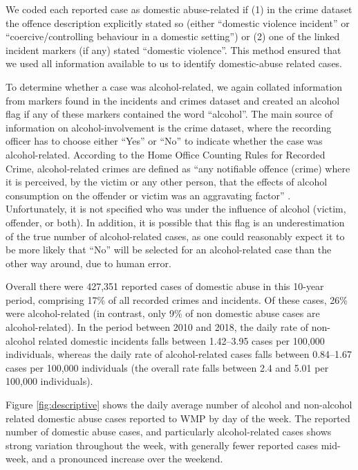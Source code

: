 \documentclass[12pt, a4paper]{article}
\begin{document}
{We coded each reported case as domestic abuse-related if (1) in the crime dataset the offence description explicitly stated so (either ``domestic violence incident'' or ``coercive/controlling behaviour in a domestic setting'') or (2) one of the linked incident markers (if any) stated ``domestic violence''. This method ensured that we used all information available to us to identify domestic-abuse related cases. 

To determine whether a case was alcohol-related, we again collated information from markers found in the incidents and crimes dataset and created an alcohol flag if any of these markers contained the word ``alcohol''. The main source of information on alcohol-involvement is the crime dataset, where the recording officer has to choose either ``Yes'' or ``No'' to indicate whether the case was alcohol-related. According to the Home Office Counting Rules for Recorded Crime, alcohol-related crimes are defined as ``any notifiable offence (crime) where it is perceived, by the victim or any other person, that the
effects of alcohol consumption on the offender or victim was an aggravating factor'' \cite{Office2019}. Unfortunately, it is not specified who was under the influence of alcohol (victim, offender, or both). In addition, it is possible that this flag is an underestimation of the true number of alcohol-related cases, as one could reasonably expect it to be more likely that ``No'' will be selected for an alcohol-related case than the other way around, due to human error. }

 Overall there were 427,351 reported cases of domestic abuse in this 10-year period, comprising 17\% of all recorded crimes and incidents. Of these cases, 26\% were alcohol-related (in contrast, only 9\% of non domestic abuse cases are alcohol-related). In the period between 2010 and 2018, the daily rate of non-alcohol related domestic incidents falls between 1.42--3.95 cases per 100,000 individuals, whereas the daily rate of alcohol-related cases falls between 0.84--1.67 cases per 100,000 individuals (the overall rate falls between 2.4 and 5.01 per 100,000 individuals). 

Figure \ref{fig:descriptive} shows the daily average number of alcohol and non-alcohol related domestic abuse cases reported to WMP by day of the week. The reported number of domestic abuse cases, and particularly alcohol-related cases shows strong variation throughout the week, with generally fewer reported cases mid-week, and a pronounced increase over the weekend. 
\end{document}
